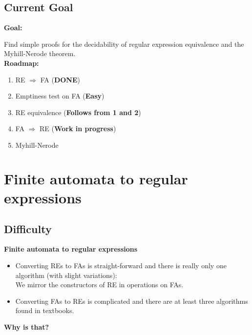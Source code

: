 \documentclass{beamer}
\begin{document}
\subsection*{Current Goal}
\begin{frame}

    \textbf{Goal:}

    Find simple proofs for the decidability of regular expression equivalence and the Myhill-Nerode theorem.\\

    \textbf{Roadmap:}

    \begin{enumerate}
        \item RE $\Rightarrow$ FA (\textbf{DONE})
        \item Emptiness test on FA (\textbf{Easy})
        \item RE equivalence (\textbf{Follows from 1 and 2})
        \item FA $\Rightarrow$ RE (\textbf{Work in progress})
        \item Myhill-Nerode
    \end{enumerate}

\end{frame}

\section*{Finite automata to regular expressions}
\subsection*{Difficulty}
\begin{frame}

    \large{\textbf{Finite automata to regular expressions}}

    \begin{itemize}
        \item
            Converting REs to FAs is straight-forward and there is really only one algorithm (with slight variations): \\
            We mirror the constructors of RE in operations on FAs.

            \pause

        \item
            Converting FAs to REs is complicated and there are at least three algorithms found in textbooks.
    \end{itemize}

    \pause

    {\centering 
        \textbf{Why is that?}

    }

\end{frame}
\end{document}
